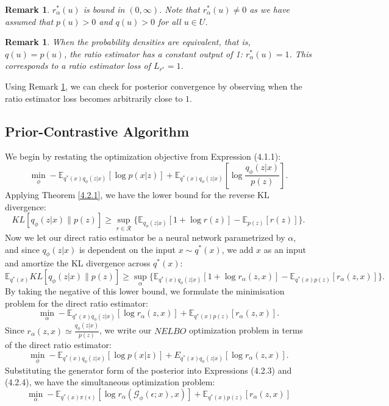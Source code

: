 \documentclass[honours,12pt]{unswthesis}
\newcommand{\E}{\mathbb{E}}
\newtheorem{remark}[theorem]{Remark}
\numberwithin{equation}{section}
\theoremstyle{definition}
\begin{document}
\begin{remark}
$r_\alpha^*(u)$ is bound in $(0,\infty)$. Note that $r_\alpha^*(u)\neq 0$ as we have assumed that $p(u)>0$ and $q(u)>0$ for all $u\in U$.
\end{remark}
\begin{remark}\label{rem:4.2.4}
When the probability densities are equivalent, that is, $q(u)=p(u)$, the ratio estimator has a constant output of 1: $r^*_\alpha(u)=1$. This corresponds to a ratio estimator loss of $L_{r^*}=1$.
\end{remark}
Using Remark \ref{rem:4.2.4}, we can check for posterior convergence by observing when the ratio estimator loss becomes arbitrarily close to $1$.
\subsection{Prior-Contrastive Algorithm}\label{sec:4.2.2}
We begin by restating the optimization objective from Expression (4.1.1):
\[\min_\phi -\mathbb{E}_{q^*(x)q_\phi(z|x)}[\log p(x|z)]+\mathbb{E}_{q^*(x)q_\phi(z|x)}\left[\log \frac{q_\phi(z|x)}{p(z)}\right].\]
Applying Theorem \ref{4.2.1}, we have the lower bound for the reverse KL divergence:
\[KL[q_\phi(z|x)\|p(z)]\geq \sup_{\hat{r}\in \mathcal{R}}\{\mathbb{E}_{q_\phi(z|x)}[1+\log r(z)]-\mathbb{E}_{p(z)}[r(z)]\}.\]
Now we let our direct ratio estimator be a neural network parametrized by $\alpha$, and since $q_\phi(z|x)$ is dependent on the input $x\sim q^*(x)$, we add $x$ as an input and amortize the KL divergence across $q^*(x)$:
\[\mathbb{E}_{q^*(x)}KL[q_\phi(z|x)\|p(z)]\geq \sup_\alpha \{\mathbb{E}_{q^*(x)q_\phi(z|x)}[1+\log r_\alpha(z,x)]-\mathbb{E}_{q^*(x)p(z)}[r_\alpha (z,x)]\}.\]
By taking the negative of this lower bound, we formulate the minimisation problem for the direct ratio estimator:
\begin{equation}
\min_\alpha -\E_{q^*(x)q_\phi(z|x)}[\log r_\alpha(z,x)]+\E_{q^*(x)p(z)}[r_\alpha (z,x)].
\end{equation}
Since $r_\alpha(z,x)\simeq \frac{q_\phi(z|x)}{p(z)}$, we write our $NELBO$ optimization problem in terms of the direct ratio estimator:
\begin{equation}
\min_\phi -\mathbb{E}_{q^*(x)q_\phi(z|x)}\left[\log p(x|z)\right]+E_{q^*(x)q_\phi (z|x)}[\log r_\alpha(z,x)].
\end{equation}
Substituting the generator form of the posterior into Expressions (4.2.3) and (4.2.4), we have the simultaneous optimization problem:
\[\min_\alpha -\mathbb{E}_{q^*(x)\pi(\epsilon)}[\log r_\alpha(\mathcal{G}_\phi(\epsilon;x),x)]+\mathbb{E}_{q^*(x)p(z)}[r_\alpha(z,x)]\]
\end{document}
